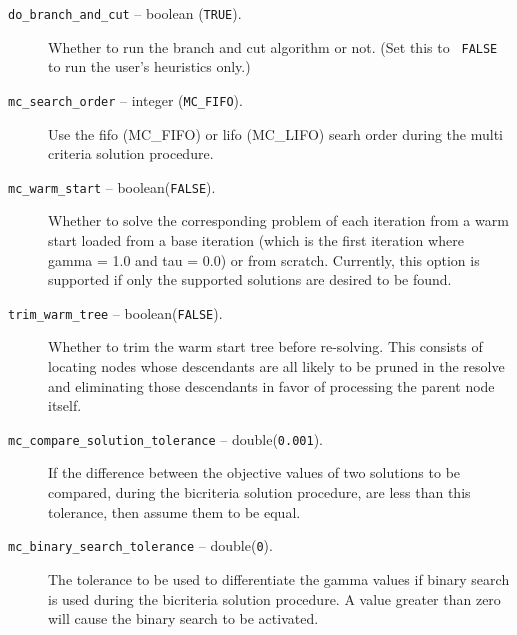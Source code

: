 \begin{description}
\item[{\tt do\_branch\_and\_cut} -- boolean ({\tt TRUE}).]
Whether to run the branch and cut algorithm or not. (Set this to {\tt
FALSE} to run the user's heuristics only.)

\item[{\tt mc\_search\_order} -- integer ({\tt MC\_FIFO}).]
Use the fifo (MC\_FIFO) or lifo (MC\_LIFO) searh order during the multi
criteria solution procedure.

\item[{\tt mc\_warm\_start} -- boolean({\tt FALSE}).]
Whether to solve the corresponding problem of each iteration from a warm 
start loaded from a base iteration (which is the first iteration where 
gamma = 1.0 and tau = 0.0) or from scratch. Currently, this option is 
supported if only the supported solutions are desired to be found.

\item[{\tt trim\_warm\_tree} -- boolean({\tt FALSE}).]
Whether to trim the warm start tree before re-solving. This consists of 
locating nodes whose descendants are all likely to be pruned in the resolve 
and eliminating those descendants in favor of processing the parent node 
itself.

\item[{\tt mc\_compare\_solution\_tolerance} -- double({\tt 0.001}).]
If the difference between the objective values of two solutions to be compared,
during the bicriteria solution procedure, are less than this tolerance, then 
assume them to be equal. 

\item[{\tt mc\_binary\_search\_tolerance} -- double({\tt 0}).]
The tolerance to be used to differentiate the gamma values if binary search 
is used during the bicriteria solution procedure. A value greater than zero
will cause the binary search to be activated.

\end{description}


